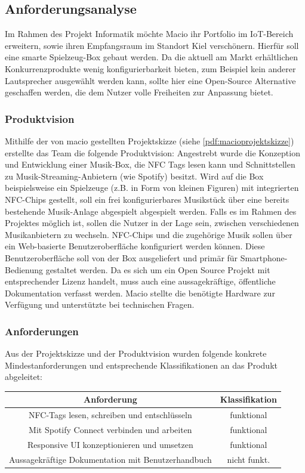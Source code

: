 \documentclass[10pt, a4paper]{article}
\begin{document}
\subsection{Anforderungsanalyse}
Im Rahmen des Projekt Informatik möchte Macio ihr Portfolio im IoT-Bereich erweitern, sowie ihren Empfangsraum im Standort Kiel verschönern.
Hierfür soll eine smarte Spielzeug-Box gebaut werden.
Da die aktuell am Markt erhältlichen Konkurrenzprodukte wenig konfigurierbarkeit bieten, zum Beispiel kein anderer Lautsprecher ausgewählt werden kann, sollte hier eine Open-Source Alternative geschaffen werden, die dem Nutzer volle Freiheiten zur Anpassung bietet.
\subsubsection{Produktvision}
Mithilfe der von macio gestellten Projektskizze (siehe \ref{pdf:macioprojektskizze}) erstellte das Team die folgende Produktvision:
Angestrebt wurde die Konzeption und Entwicklung einer Musik-Box, die NFC Tags lesen kann und Schnittstellen zu Musik-Streaming-Anbietern (wie Spotify) besitzt.
Wird auf die Box beispielsweise ein Spielzeuge (z.B. in Form von kleinen Figuren) mit integrierten NFC-Chips gestellt, soll ein frei konfigurierbares Musikstück über eine bereits bestehende Musik-Anlage abgespielt abgespielt werden.
Falls es im Rahmen des Projektes möglich ist, sollen die Nutzer in der Lage sein, zwischen verschiedenen Musikanbietern zu wechseln.
NFC-Chips und die zugehörige Musik sollen über ein Web-basierte Benutzeroberfläche konfiguriert werden können.
Diese Benutzeroberfläche soll von der Box ausgeliefert und primär für Smartphone-Bedienung gestaltet werden.
Da es sich um ein Open Source Projekt mit entsprechender Lizenz handelt, muss auch eine aussagekräftige, öffentliche Dokumentation verfasst werden.
Macio stellte die benötigte Hardware zur Verfügung und unterstützte bei technischen Fragen.\\

\subsubsection{Anforderungen}
Aus der Projektskizze und der Produktvision wurden folgende konkrete Mindestanforderungen und entsprechende Klassifikationen an das Produkt abgeleitet:
\begin{center}
  \begin{tabular}[h]{c|c}
    Anforderung & Klassifikation \\
    \hline
    NFC-Tags lesen, schreiben und entschlüsseln & funktional  \\
    Mit Spotify Connect verbinden und arbeiten & funktional \\
    Responsive UI konzeptionieren und umsetzen & funktional  \\
    Aussagekräftige Dokumentation mit Benutzerhandbuch & nicht funkt.  \\
  \end{tabular}
\end{center}
\end{document}
